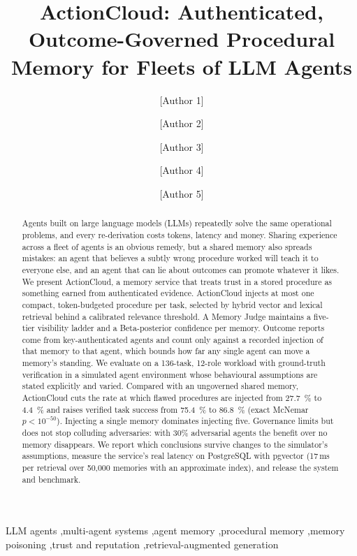 \documentclass[5p,times,twocolumn]{elsarticle}
\newcommand{\sysname}{ActionCloud}
\begin{document}
\begin{frontmatter}

\title{\sysname{}: Authenticated, Outcome-Governed Procedural Memory for Fleets of LLM Agents}

\author[inst1]{[Author 1]}
\ead{[email]}
\author[inst1]{[Author 2]}
\author[inst1]{[Author 3]}
\author[inst1]{[Author 4]}
\author[inst1]{[Author 5]}

\begin{abstract}
Agents built on large language models (LLMs) repeatedly solve the same operational problems, and every re-derivation costs tokens, latency and money. Sharing experience across a fleet of agents is an obvious remedy, but a shared memory also spreads mistakes: an agent that believes a subtly wrong procedure worked will teach it to everyone else, and an agent that can lie about outcomes can promote whatever it likes. We present \sysname{}, a memory service that treats trust in a stored procedure as something earned from authenticated evidence. \sysname{} injects at most one compact, token-budgeted procedure per task, selected by hybrid vector and lexical retrieval behind a calibrated relevance threshold. A Memory Judge maintains a five-tier visibility ladder and a Beta-posterior confidence per memory. Outcome reports come from key-authenticated agents and count only against a recorded injection of that memory to that agent, which bounds how far any single agent can move a memory's standing. We evaluate on a 136-task, 12-role workload with ground-truth verification in a simulated agent environment whose behavioural assumptions are stated explicitly and varied. Compared with an ungoverned shared memory, \sysname{} cuts the rate at which flawed procedures are injected from \SI{27.7}{\percent} to \SI{4.4}{\percent} and raises verified task success from \SI{75.4}{\percent} to \SI{86.8}{\percent} (exact McNemar $p<10^{-50}$). Injecting a single memory dominates injecting five. Governance limits but does not stop colluding adversaries: with 30\% adversarial agents the benefit over no memory disappears. We report which conclusions survive changes to the simulator's assumptions, measure the service's real latency on PostgreSQL with pgvector (17\,ms per retrieval over 50,000 memories with an approximate index), and release the system and benchmark.
\end{abstract}

\begin{keyword}
LLM agents \sep multi-agent systems \sep agent memory \sep procedural memory \sep memory poisoning \sep trust and reputation \sep retrieval-augmented generation
\end{keyword}

\end{frontmatter}
\end{document}
